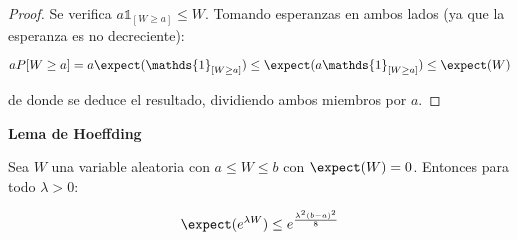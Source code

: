 \begin{proof}
 Se verifica $a\mathds{1}_{[W\ge a]} \le W$. Tomando esperanzas en ambos lados (ya que la esperanza es no 
 decreciente):
 
 \[aP[W\ge a] = a\expect(\mathds{1}_{[W\ge a]}) \le \expect(a\mathds{1}_{[W\ge a]}) \le \expect(W)\]
 
 de donde se deduce el resultado, dividiendo ambos miembros por $a$.
\end{proof}

\begin{lemma} \textbf{Lema de Hoeffding}

 Sea $W$ una variable aleatoria con $a\le W \le b$ con $\expect(W) = 0$. Entonces para todo $\lambda > 0$:
 
 \[\expect(e^{\lambda W}) \le e^{\frac{\lambda^2(b-a)^2}{8}}\]
 
 \label{lemma:hoeffding}
\end{lemma}

